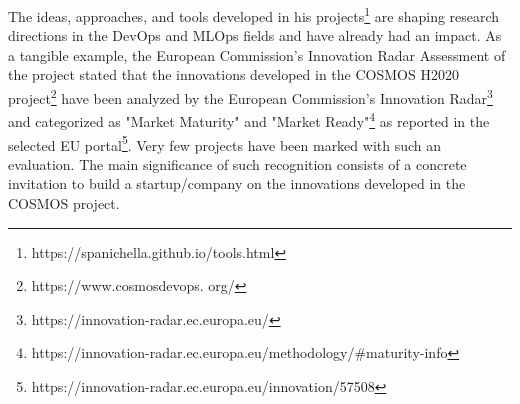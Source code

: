 \documentclass[11pt]{article}
\begin{document}
\vspace{-2.5mm}
The ideas, approaches, and tools developed in his projects\footnote{https://spanichella.github.io/tools.html} are shaping research directions in the DevOps and MLOps fields and have already had an impact. As a tangible example, the European Commission's Innovation Radar Assessment of the project stated that the innovations developed in the COSMOS H2020 project\footnote{https://www.cosmosdevops.
org/} have been analyzed by the European Commission's Innovation Radar\footnote{https://innovation-radar.ec.europa.eu/} and categorized as "Market Maturity" and "Market
Ready"\footnote{https://innovation-radar.ec.europa.eu/methodology/\#maturity-info} as reported in the
selected EU portal\footnote{https://innovation-radar.ec.europa.eu/innovation/57508}. Very few projects
have been marked with such an evaluation. The main significance of such recognition consists of a
concrete invitation to build a startup/company on the innovations developed in the COSMOS project.
\end{document}
